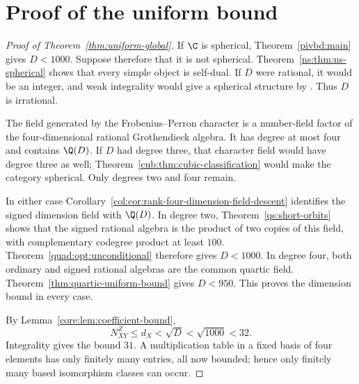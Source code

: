 \section{Proof of the uniform bound}\label{sec:global-bound-proof}
\begin{proof}[Proof of Theorem~\ref{thm:uniform-global}]
If $\C$ is spherical, Theorem~\ref{pivbd:main} gives
$D<1000$. Suppose therefore that it is not spherical.
Theorem~\ref{ns:thm:ns-spherical} shows that every simple object is
self-dual. If $D$ were rational, it would be an integer, and weak
integrality would give a spherical structure by
\cite[Proposition~8.24]{ENO}. Thus $D$ is irrational.

The field generated by the Frobenius--Perron character is a number-field
factor of the four-dimensional rational Grothendieck algebra. It has
degree at most four and contains $\Q(D)$. If $D$ had degree
three, that character field would have degree three as well;
Theorem~\ref{cub:thm:cubic-classification} would make the category
spherical. Only degrees two and four remain.

In either case Corollary~\ref{col:cor:rank-four-dimension-field-descent}
identifies the signed dimension field with $\Q(D)$.
In degree two, Theorem~\ref{qs:short-orbits} shows that the signed
rational algebra is the product of two copies of this field, with
complementary codegree product at least $100$.
Theorem~\ref{quad:opt:unconditional} therefore gives $D<1000$.
In degree four, both ordinary and signed rational algebras are the
common quartic field. Theorem~\ref{thm:quartic-uniform-bound} gives $D<950$.
This proves the dimension bound in every case.

By Lemma~\ref{core:lem:coefficient-bound},
\[
 N_{XY}^{Z}\le d_X<\sqrt D<\sqrt{1000}<32.
\]
Integrality gives the bound $31$. A multiplication table in a fixed
basis of four elements has only finitely many entries, all now bounded;
hence only finitely many based isomorphism classes can occur.
\end{proof}

